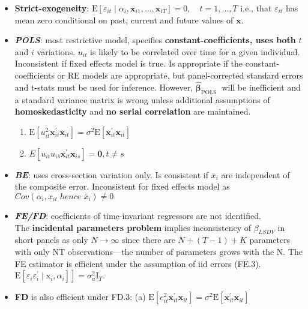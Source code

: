 \documentclass[
]{article}
\begin{document}
\begin{itemize}
\item
  \textbf{Strict-exogeneity}:
  \(\mathrm{E}\left[\varepsilon_{i t} \mid \alpha_{i}, \mathbf{x}_{i 1}, \ldots, \mathbf{x}_{i T}\right]=0, \quad t=1, \ldots, T\)
  i.e., that \(\varepsilon_{i t}\) has mean zero conditional on past,
  current and future values of \(\mathbf{x}\).
\item
  \textbf{\emph{POLS}}: most restrictive model, specifies
  \textbf{constant-coefficients, uses both} \(t\) and \(i\) variations.
  \(u_{it}\) is likely to be correlated over time for a given
  individual. Inconsistent if fixed effects model is true. Is
  appropriate if the constant-coefficients or RE models are appropriate,
  but panel-corrected standard errors and t-stats must be used for
  inference. However, \(\boldsymbol{\widehat\beta}_{\text {POLS }}\)
  will be inefficient and a standard variance matrix is wrong unless
  additional assumptions of \textbf{homoskedasticity} and \textbf{no
  serial correlation} are maintained.

  \begin{enumerate}
  \def\labelenumi{\alph{enumi})}
  \item
    \(\mathrm{E}\left[u_{i t}^{2} \mathbf{x}_{i t}^{\prime} \mathbf{x}_{i t}\right]=\sigma^{2} \mathrm{E}\left[\mathbf{x}_{i t}^{\prime} \mathbf{x}_{i t}\right]\)
  \item
    \(E\left[u_{i t} u_{i s} \mathbf{x}_{i t}^{\prime} \mathbf{x}_{i s}\right]=\mathbf{0}, t \neq s\)
  \end{enumerate}
\item
  \textbf{\emph{BE}}: uses cross-section variation only. Is consistent
  if \(\bar x_i\) are independent of the composite error. Inconsistent
  for fixed effects model as
  \(Cov(\alpha_i, x_{it} \; hence \; \bar x_{i}) \neq 0\)
\item
  \textbf{\emph{FE/FD}}: coefficients of time-invariant regressors are
  not identified.\\
  The \textbf{incidental parameters problem} implies inconsistency of
  \(\beta_{LSDV}\) in short panels as only \(N \to \infty\) since there
  are \(N + (T-1) + K\) parameters with only NT observations---the
  number of parameters grows with the N. The FE estimator is efficient
  under the assumption of iid errors (FE.3).
  \(\left.\mathrm{E}\left[\varepsilon_{i} \varepsilon_{i}^{\prime} \mid \mathrm{x}_{i}, \alpha_{i}\right]\right]=\sigma_{u}^{2} \mathrm{I}_{T}\).
\item
  \textbf{FD} is also efficient under FD.3: (a)
  \(\mathrm{E}\left[e_{i t}^{2} \mathbf{x}_{i t}^{\prime} \mathbf{x}_{i t}\right]=\sigma^{2} \mathrm{E}\left[\mathbf{x}_{i t}^{\prime} \mathbf{x}_{i t}\right]\)


\end{itemize}
\end{document}

